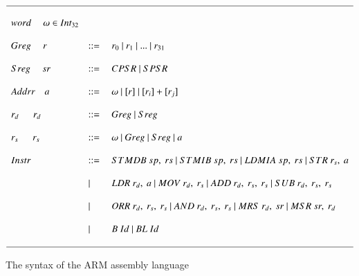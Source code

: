 \documentclass[letterpaper, 10 pt, conference]{IEEEtran}
\begin{document}
\begin{figure*}
\begin{displaymath}
\begin{array}{l l l}
\hline\\
word~~~~~\omega \in Int_{32} \\ \\
Greg~~~~~r &::=&~r_0~|~r_1~|~...~|~r_{31} \\ \\
Sreg~~~~~sr &::=&~CPSR~|~SPSR \\ \\
Addrr~~~~a &::=&~\omega~|~[r]~|~[r_i]+[r_j] \\ \\
r_d~~~~~~r_d &::=&~Greg~|~Sreg\\ \\
r_s~~~~~~r_s &::=&~\omega~|~Greg~|~Sreg~|~a \\ \\
Instr &::=&~STMDB~sp,~rs~|~STMIB~sp,~rs~|~LDMIA~sp,~rs~|~STR~r_s,~a\\ \\&|&~LDR~r_d,~a~|~MOV~r_d,~r_s~|~ADD~r_d,~r_s,~r_s~|~SUB~r_d,~r_s,~r_s\\ \\&|&~ORR~r_d,~r_s,~r_s~|~AND~r_d,~r_s,~r_s~|~MRS~r_d,~sr~|~MSR~sr,~r_d\\ \\&|&~B~Id~|~BL~Id\\ \\
\hline

\end{array}
\end{displaymath}
\caption{The syntax of the ARM assembly language}
\label{arm-syntax}
\end{figure*}
\end{document}
